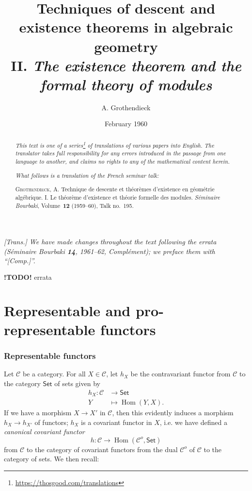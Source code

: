 \documentclass{article}
\title{Techniques of descent and existence theorems in algebraic geometry\\II. \emph{The existence theorem and the formal theory of modules}}
\author{A. Grothendieck}
\date{February 1960}
\theoremstyle{plain}
\theoremstyle{definition}
\newcommand{\cat}[1]{{\mathcal{#1}}}
\newcommand{\Set}{\mathsf{Set}}
\DeclareMathOperator{\Hom}{Hom}
\newcommand{\todo}{\textbf{ !TODO! }}
\newcommand{\oldpage}[1]{\marginpar{\footnotesize$\Big\vert$ \textit{p.~#1}}}
\begin{document}
\maketitle
\thispagestyle{fancy}

\renewcommand{\abstractname}{Translator's note.}

\begin{abstract}
  \renewcommand*{\thefootnote}{\fnsymbol{footnote}}
  \emph{This text is one of a series\footnote{\url{https://thosgood.com/translations}} of translations of various papers into English.}
  \emph{The translator takes full responsibility for any errors introduced in the passage from one language to another, and claims no rights to any of the mathematical content herein.}

  \medskip
  
  \emph{What follows is a translation of the French seminar talk:}

  \medskip\noindent
  \textsc{Grothendieck, A.}
  Technique de descente et th\'{e}or\`{e}mes d'existence en g\'{e}om\'{e}trie alg\'{e}brique. I. Le th\'{e}or\`{e}me d'existence et th\'{e}orie formelle des modules.
  \emph{S\'{e}minaire Bourbaki}, Volume~\textbf{12} (1959--60), Talk no.~195.
\end{abstract}

\setcounter{footnote}{0}

\setcounter{tocdepth}{1}
\tableofcontents



\subsubsection*{}

\emph{[Trans.] We have made changes throughout the text following the errata (\emph{S\'{e}minaire Bourbaki} \textbf{14}, 1961--62, Compl\'{e}ment); we preface them with ``[Comp.]''.}
\medskip

\todo{errata}

\oldpage{195-01}
\part{Representable and pro-representable functors}
\label{A}

\section{Representable functors}
\label{A.1}

Let $\cat{C}$ be a category.
For all $X\in\cat{C}$, let $h_X$ be the contravariant functor from $\cat{C}$ to the category $\Set$ of sets given by
\[
  \begin{aligned}
    h_X\colon \cat{C} &\to \Set
  \\Y&\mapsto \Hom(Y,X).
  \end{aligned}
\]
If we have a morphism $X\to X'$ in $\cat{C}$, then this evidently induces a morphism $h_X\to h_{X'}$ of functors;
$h_X$ is a covariant functor in $X$, i.e. we have defined a \emph{canonical covariant functor}
\[
  h\colon \cat{C} \to \Hom(\cat{C}^o,\Set)
\]
from $\cat{C}$ to the category of covariant functors from the dual $\cat{C}^o$ of $\cat{C}$ to the category of sets.
We then recall:
\end{document}
